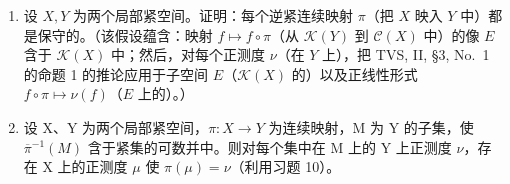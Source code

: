 \begin{enumerate}
\def\labelenumi{\arabic{enumi})}
\setcounter{enumi}{9}
\item
  设 \(X, Y\) 为两个局部紧空间。证明：每个逆紧连续映射 \(\pi\)（把 \(X\) 映入 \(Y\) 中）都是保守的。（该假设蕴含：映射 \(f \mapsto f \circ \pi\)（从 \(\mathcal{K}(Y)\) 到 \(\mathcal{C}(X)\) 中）的像 \(E\) 含于 \(\mathcal{K}(X)\) 中；然后，对每个正测度 \(\nu\)（在 \(Y\) 上），把 TVS, II, §3, No.~1 的命题 1 的推论应用于子空间 \(E\)（\(\mathcal{K}(X)\) 的）以及正线性形式 \(f \circ \pi \mapsto \nu(f)\)（\(E\) 上的）。）
\item
  设 X、Y 为两个局部紧空间，\(\pi: X \to Y\) 为连续映射，M 为 Y 的子集，使 \(\overline{\pi}^{-1}(M)\) 含于紧集的可数并中。则对每个集中在 M 上的 Y 上正测度 \(\nu\)，存在 X 上的正测度 \(\mu\) 使 \(\pi(\mu) = \nu\)（利用习题 10）。
\end{enumerate}
